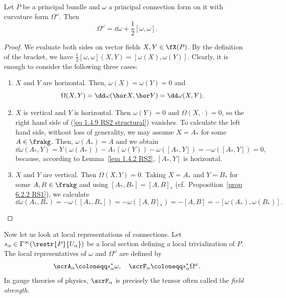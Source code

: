\begin{prop}
    Let $P$ be a principal bundle and $\omega$ a principal connection form on it with curvature form $\Omega^\omega$. Then
    \[\Omega^\omega=\dd\omega+\frac12[\omega,\omega].\label{eq 1.4.9 RS2 structural}\]
\end{prop}
\begin{proof}
    We evaluate both sides on vector fields $X,Y\in\fX(P)$. By the definition of the bracket, we have $\frac12[\omega,\omega](X,Y)=[\omega(X),\omega(Y)]$. Clearly, it is enough to consider the following three cases:
    \begin{enumerate}
        \item $X$ and $Y$ are horizontal. Then, $\omega(X)=\omega(Y)=0$ and
        \[\Omega(X,Y)=\dd\omega(\hor X,\hor Y)=\dd\omega(X,Y).\]
        
        \item $X$ is vertical and $Y$ is horizontal. Then $\omega(Y)=0$ and $\Omega(X,\cdot)=0$, so the right hand side of (\ref{eq 1.4.9 RS2 structural}) vanishes. To calculate the left hand side, without loss of generality, we may assume $X=A_\ast$ for some $A\in\frakg$. Then, $\omega(A_\ast)=A$ and we obtain
        \[\dd\omega(A_\ast,Y)=Y(\omega(A_\ast))-A_\ast(\omega(Y))-\omega([A_\ast,Y])=-\omega([A_\ast,Y])=0,\]
        because, according to Lemma~\ref{lem 1.4.2 RS2}, $[A_\ast,Y]$ is horizontal.

        \item $X$ and $Y$ are vertical. Then $\Omega(X,Y)=0$. Taking $X=A_\ast$ and $Y=B_\ast$ for some $A,B\in\frakg$ and using $[A_\ast,B_\ast]=[A,B]_\ast$ (cf.\ Proposition~\ref{prop 6.2.2 RS1}), we calculate
        \[\dd\omega(A_\ast,B_\ast)=-\omega([A_\ast,B_\ast])=-\omega([A,B]_\ast)=-[A,B]=-[\omega(A_\ast),\omega(B_\ast)].\]
    \end{enumerate}
\end{proof}



Now let us look at local representations of connections. Let $s_\alpha\in\Gamma^\infty(\restr{P}{U_\alpha})$ be a local section defining  a local trivialization of $P$. The local representatives of $\omega$ and $\Omega^\omega$ are defined by
\[\scrA_\alpha\coloneqq s_\alpha^\ast\omega,\quad \scrF_\alpha\coloneqq s_\alpha^\ast \Omega^\omega.\]
In gauge theories of physics, $\scrF_\alpha$ is precisely the tensor often called the \emph{field strength}. 

